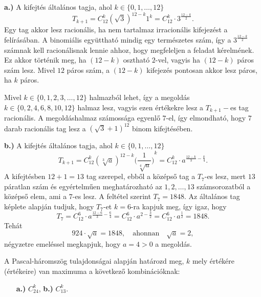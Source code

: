 \begin{solution}
\textbf{a.)} A kifejtés általános tagja, ahol $k\in\{0,1,\ldots,12\}$
\[
T_{k+1}=C_{12}^{k}(\sqrt{3})^{12-k}1^{k}=C_{12}^{k}\cdot3^{\frac{12-k}{2}}.
\]
Egy tag akkor lesz racionális, ha nem tartalmaz irracionális kifejezést
a felírásában. A binomiális együttható mindig egy természetes szám,
így a $3^{\frac{12-k}{2}}$ számnak kell racionálisnak lennie ahhoz,
hogy megfeleljen a feladat kérelmének. Ez akkor történik meg, ha $(12-k)$
osztható $2$-vel, vagyis ha $(12-k)$ páros szám lesz. Mivel $12$
páros szám, a $(12-k)$ kifejezés pontosan akkor lesz páros, ha $k$
páros.

Mivel $k\in\{0,1,2,3,\ldots,12\}$ halmazból lehet, így a megoldás
 $k\in\{0,2,4,6,8,10,12\}$ halmaz lesz, vagyis
ezen értékekre lesz a $T_{k+1}-$es tag racionális. A megoldáshalmaz
számossága egyenlő $7$-el, így elmondható, hogy $7$ darab racionális
tag lesz a $(\sqrt{3}+1)^{12}$ binom kifejtésében.

\vspace{0.1cm}

\textbf{b.)} A kifejtés általános tagja, ahol $k\in\{0,1,\ldots,12\}$
\[
T_{k+1}=C_{12}^{k}(\sqrt[3]{a})^{12-k}{\Big(\frac{1}{\sqrt[4]{a}}\Big)}^{k}=C_{12}^{k}\cdot a^{\frac{12-k}{3}-\frac{k}{4}}.
\]
A kifejtésben $12+1=13$ tag szerepel, ebből a középső tag a $T_{7}$-es
lesz, mert $13$ páratlan szám és egyértelműen meghatározható az $1,2,\ldots,13$
számsorozatból a középső elem, ami a $7$-es lesz. A feltétel szerint
$T_{7}=1848$. Az általános tag képlete alapján tudjuk, hogy $T_{7}$-et
$k=6$-ra kapjuk meg, így igaz, hogy 
\[
T_{7}=C_{12}^{6}\cdot a^{\frac{12-6}{3}-\frac{6}{4}}=C_{12}^{6}\cdot a^{2-\frac{3}{2}}=C_{12}^{6}\cdot a^{\frac{1}{2}}=1848.
\]
Tehát 
\[
924\cdot\sqrt{a}=1848,\quad\text{ahonnan}\quad\sqrt{a}=2,
\]
négyzetre emeléssel megkapjuk, hogy $a=4>0$ a megoldás. 
\end{solution}
\vspace{0.3cm}

\begin{problem}
A Pascal-háromszög tulajdonságai alapján határozd meg, $k$ mely értékére
(értékeire) van maximuma a következő kombinációknak: 
\begin{enumerate}
\item[{\small\textbf{a.)}}] ${\displaystyle C_{24}^{k}}$, \quad{}\quad{}\textbf{b.)} ${\displaystyle C_{13}^{k}}$. 
\end{enumerate}
\end{problem}

